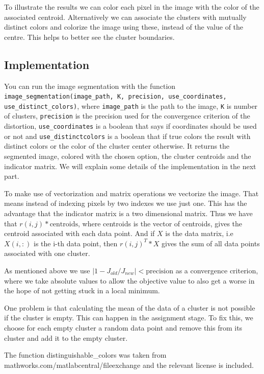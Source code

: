 To illustrate the results we can color each pixel in the image with the color of the associated centroid. Alternatively we can associate the clusters with mutually distinct colors and colorize the image using these, instead of the value of the centre. This helps to better see the cluster boundaries.

\subsection{Implementation}

You can run the image segmentation with the function \texttt{image\_segmentation(image\_path, K, precision, use\_coordinates, use\_distinct\_colors)}, where \texttt{image\_path} is the path to the image, \texttt{K} is number of clusters, \texttt{precision} is the precision used for the convergence criterion of the distortion, \texttt{use\_coordinates} is a boolean that says if coordinates should be used or not and \texttt{use\_distinctcolors} is a boolean that if true colors the result with distinct colors or the color of the cluster center otherwise. It returns the segmented image, colored with the chosen option, the cluster centroids and the indicator matrix.
 We will explain some details of the implementation in the next part.

To make use of vectorization and matrix operations we vectorize the image. That means instead of indexing pixels by two indexes we use just one. This has the advantage that the indicator matrix is a two dimensional matrix. Thus we have that $r(i,j)*\text{centroids}$, where centroids is the vector of centroids, gives the centroid associated with each data point. And if $X$ is the data matrix, i.e $X(i,:)$ is the i-th data point, then $r(i,j)^T * X$ gives the sum of all data points associated with one cluster.

As mentioned above we use $\vert 1-J_{old}/J_{new}\vert < \text{precision}$ as a convergence criterion, where we take absolute values to allow the objective value to also get a worse in the hope of not getting stuck in a local minimum.

One problem is that calculating the mean of the data of a cluster is not possible if the cluster is empty. This can happen in the assignment stage. To fix this, we choose for each empty cluster a random data point and remove this from its cluster and add it to the empty cluster.

The function distinguishable\_colors was taken from mathworks.com/matlabcentral/fileexchange and the relevant license is included.
